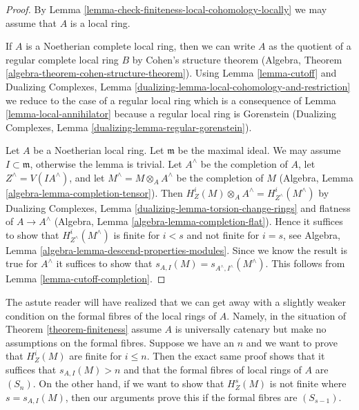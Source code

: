 \begin{proof}
By Lemma \ref{lemma-check-finiteness-local-cohomology-locally}
we may assume that $A$ is a local ring.

\medskip\noindent
If $A$ is a Noetherian complete local ring, then we can write $A$
as the quotient of a regular complete local ring $B$ by
Cohen's structure theorem
(Algebra, Theorem \ref{algebra-theorem-cohen-structure-theorem}).
Using Lemma \ref{lemma-cutoff} and
Dualizing Complexes, Lemma
\ref{dualizing-lemma-local-cohomology-and-restriction}
we reduce to the case
of a regular local ring which is a consequence of
Lemma \ref{lemma-local-annihilator}
because a regular local ring is Gorenstein
(Dualizing Complexes, Lemma \ref{dualizing-lemma-regular-gorenstein}).

\medskip\noindent
Let $A$ be a Noetherian local ring. Let $\mathfrak m$ be the maximal ideal.
We may assume $I \subset \mathfrak m$, otherwise the lemma is trivial.
Let $A^\wedge$ be the completion of $A$, let $Z^\wedge = V(IA^\wedge)$, and
let $M^\wedge = M \otimes_A A^\wedge$ be the completion of $M$
(Algebra, Lemma \ref{algebra-lemma-completion-tensor}).
Then $H^i_Z(M) \otimes_A A^\wedge = H^i_{Z^\wedge}(M^\wedge)$ by
Dualizing Complexes, Lemma \ref{dualizing-lemma-torsion-change-rings}
and flatness of $A \to A^\wedge$
(Algebra, Lemma \ref{algebra-lemma-completion-flat}).
Hence it suffices to show that $H^i_{Z^\wedge}(M^\wedge)$ is
finite for $i < s$ and not finite for $i = s$, see
Algebra, Lemma \ref{algebra-lemma-descend-properties-modules}.
Since we know the result is true for $A^\wedge$ it suffices
to show that $s_{A, I}(M) = s_{A^\wedge, I^\wedge}(M^\wedge)$.
This follows from Lemma \ref{lemma-cutoff-completion}.
\end{proof}

\begin{remark}
\label{remark-astute-reader}
The astute reader will have realized that we can get away with a
slightly weaker condition on the formal fibres of the local rings
of $A$. Namely, in the situation of Theorem \ref{theorem-finiteness}
assume $A$ is universally catenary but make no assumptions on
the formal fibres. Suppose we have an $n$ and we want to prove that
$H^i_Z(M)$ are finite for $i \leq n$. Then the exact same proof
shows that it suffices that $s_{A, I}(M) > n$ and that
the formal fibres of local rings of $A$ are $(S_n)$.
On the other hand, if we want to show that $H^s_Z(M)$
is not finite where $s = s_{A, I}(M)$, then our arguments prove
this if the formal fibres are $(S_{s - 1})$.
\end{remark}







